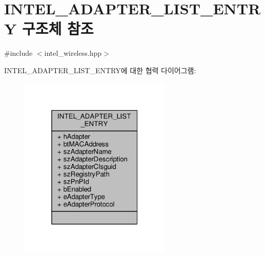 \hypertarget{struct_i_n_t_e_l___a_d_a_p_t_e_r___l_i_s_t___e_n_t_r_y}{}\section{I\+N\+T\+E\+L\+\_\+\+A\+D\+A\+P\+T\+E\+R\+\_\+\+L\+I\+S\+T\+\_\+\+E\+N\+T\+RY 구조체 참조}
\label{struct_i_n_t_e_l___a_d_a_p_t_e_r___l_i_s_t___e_n_t_r_y}


{\ttfamily \#include $<$intel\+\_\+wireless.\+hpp$>$}



I\+N\+T\+E\+L\+\_\+\+A\+D\+A\+P\+T\+E\+R\+\_\+\+L\+I\+S\+T\+\_\+\+E\+N\+T\+R\+Y에 대한 협력 다이어그램\+:
\nopagebreak
\begin{figure}[H]
\begin{center}
\leavevmode
\includegraphics[width=205pt]{struct_i_n_t_e_l___a_d_a_p_t_e_r___l_i_s_t___e_n_t_r_y__coll__graph}
\end{center}
\end{figure}
